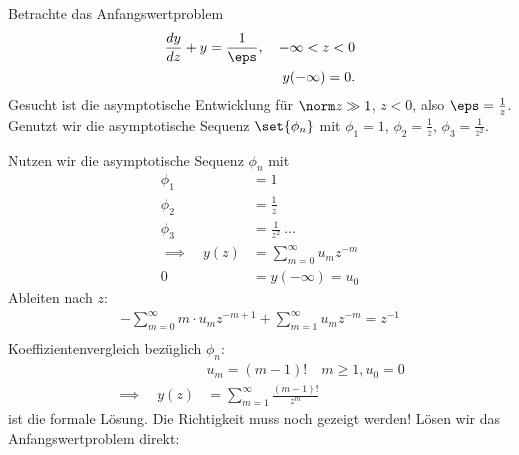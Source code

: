 \begin{beispiel}\label{ex:3-4}
  Betrachte das Anfangswertproblem
  \begin{align*}
    \frac{dy}{dz} + y = \frac 1 \eps, \quad - \infty < z <0\\
    y(- \infty) = 0. 
  \end{align*}
Gesucht ist die asymptotische Entwicklung für $\norm z \gg 1$, $z <0$, also $\eps = \frac 1 z$. Genutzt wir die asymptotische Sequenz $\set{\phi_{n}}$ mit $\phi_{1} = 1$, $\phi_{2} = \frac 1 z$, $\phi_{3}= \frac 1 {z^{2}}$. 

Nutzen wir die asymptotische Sequenz $\phi_{n}$ mit
\begin{align*}
  \phi_{1} &= 1\\
  \phi_{2} &= \frac 1z\\
  \phi_{3} &= \frac 1{z^{2}}\ \dots\\
\implies \quad y(z) &= \sum_{m = 0}^{\infty} u_{m} z^{-m}\\
0 &= y(- \infty) = u_{0}
\end{align*}
Ableiten nach $z$: 
\begin{align*}
  -\sum_{m = 0}^{\infty} m\cdot u_{m} z^{-m+1} +\sum_{m = 1}^{\infty} u_{m} z^{-m} = z^{-1}\\
\end{align*}
Koeffizientenvergleich bezüglich $\phi_{n}$:
\begin{align*}
& u_{m} = (m-1)!\quad m\geq 1, u_{0} = 0\\
\implies \quad y(z) &= \sum_{m = 1}^{\infty} \frac{(m-1)!}{z^{m}}
\end{align*}
ist die formale Lösung. Die Richtigkeit muss noch gezeigt werden! Lösen wir das Anfangswertproblem direkt: 


\end{beispiel}
